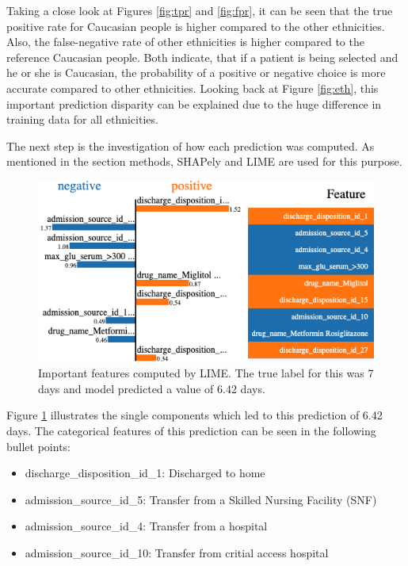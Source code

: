 \documentclass[journal]{IEEEtran}
\begin{document}
Taking a close look at Figures \ref{fig:tpr} and \ref{fig:fpr}, it can be seen that the true positive rate for Caucasian people is higher compared to the other ethnicities. Also, the false-negative rate of other ethnicities is higher compared to the reference Caucasian people. Both indicate, that if a patient is being selected and he or she is Caucasian, the probability of a positive or negative choice is more accurate compared to other ethnicities. Looking back at Figure \ref{fig:eth}, this important prediction disparity can be explained due to the huge difference in training data for all ethnicities. 

The next step is the investigation of how each prediction was computed. As mentioned in the section methods, SHAPely and LIME are used for this purpose. 

\begin{figure}
	\centering
	\includegraphics[width=1\linewidth]{../imgs/lime_paper}
	\caption{Important features computed by LIME. The true label for this was 7 days and model predicted a value of 6.42 days.}
	\label{fig:lime}
\end{figure}

Figure \ref{fig:lime} illustrates the single components which led to this prediction of 6.42 days. The categorical features of this prediction can be seen in the following bullet points:  

\begin{itemize}
	\item discharge\_disposition\_id\_1: Discharged to home
	\item admission\_source\_id\_5: Transfer from a Skilled Nursing Facility (SNF)
	\item admission\_source\_id\_4: Transfer from a hospital
	\item admission\_source\_id\_10: Transfer from critial access hospital
\end{itemize}
\end{document}
